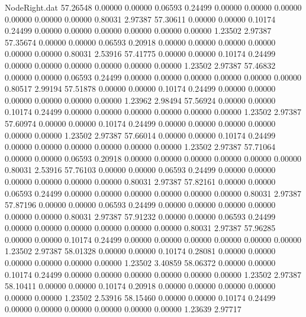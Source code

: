 \begin{filecontents}{NodeRight.dat}
  57.26548    0.00000    0.00000     0.06593    0.24499    0.00000    0.00000    0.00000    0.00000    0.00000    0.00000    0.80031    2.97387
  57.30611    0.00000    0.00000     0.10174    0.24499    0.00000    0.00000    0.00000    0.00000    0.00000    0.00000    1.23502    2.97387
  57.35674    0.00000    0.00000     0.06593    0.20918    0.00000    0.00000    0.00000    0.00000    0.00000    0.00000    0.80031    2.53916
  57.41775    0.00000    0.00000     0.10174    0.24499    0.00000    0.00000    0.00000    0.00000    0.00000    0.00000    1.23502    2.97387
  57.46832    0.00000    0.00000     0.06593    0.24499    0.00000    0.00000    0.00000    0.00000    0.00000    0.00000    0.80517    2.99194
  57.51878    0.00000    0.00000     0.10174    0.24499    0.00000    0.00000    0.00000    0.00000    0.00000    0.00000    1.23962    2.98494
  57.56924    0.00000    0.00000     0.10174    0.24499    0.00000    0.00000    0.00000    0.00000    0.00000    0.00000    1.23502    2.97387
  57.60974    0.00000    0.00000     0.10174    0.24499    0.00000    0.00000    0.00000    0.00000    0.00000    0.00000    1.23502    2.97387
  57.66014    0.00000    0.00000     0.10174    0.24499    0.00000    0.00000    0.00000    0.00000    0.00000    0.00000    1.23502    2.97387
  57.71064    0.00000    0.00000     0.06593    0.20918    0.00000    0.00000    0.00000    0.00000    0.00000    0.00000    0.80031    2.53916
  57.76103    0.00000    0.00000     0.06593    0.24499    0.00000    0.00000    0.00000    0.00000    0.00000    0.00000    0.80031    2.97387
  57.82161    0.00000    0.00000     0.06593    0.24499    0.00000    0.00000    0.00000    0.00000    0.00000    0.00000    0.80031    2.97387
  57.87196    0.00000    0.00000     0.06593    0.24499    0.00000    0.00000    0.00000    0.00000    0.00000    0.00000    0.80031    2.97387
  57.91232    0.00000    0.00000     0.06593    0.24499    0.00000    0.00000    0.00000    0.00000    0.00000    0.00000    0.80031    2.97387
  57.96285    0.00000    0.00000     0.10174    0.24499    0.00000    0.00000    0.00000    0.00000    0.00000    0.00000    1.23502    2.97387
  58.01328    0.00000    0.00000     0.10174    0.28081    0.00000    0.00000    0.00000    0.00000    0.00000    0.00000    1.23502    3.40859
  58.06372    0.00000    0.00000     0.10174    0.24499    0.00000    0.00000    0.00000    0.00000    0.00000    0.00000    1.23502    2.97387
  58.10411    0.00000    0.00000     0.10174    0.20918    0.00000    0.00000    0.00000    0.00000    0.00000    0.00000    1.23502    2.53916
  58.15460    0.00000    0.00000     0.10174    0.24499    0.00000    0.00000    0.00000    0.00000    0.00000    0.00000    1.23639    2.97717

\end{filecontents}
